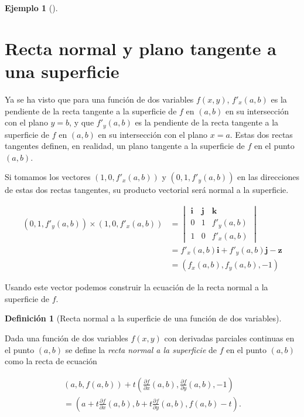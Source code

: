 \documentclass[
  a4paper,
]{scrreport}
\theoremstyle{definition}
\newtheorem{example}{Ejemplo}[chapter]
\theoremstyle{plain}
\theoremstyle{definition}
\newtheorem{definition}{Definición}[chapter]
\theoremstyle{definition}
\theoremstyle{plain}
\theoremstyle{plain}
\theoremstyle{remark}
\begin{document}
\begin{example}[]
\section{Recta normal y plano tangente a una
superficie}\label{recta-normal-y-plano-tangente-a-una-superficie}

Ya se ha visto que para una función de dos variables \(f(x,y)\),
\(f'_{x}(a,b)\) es la pendiente de la recta tangente a la superficie de
\(f\) en \((a,b)\) en su intersección con el plano \(y=b\), y que
\(f'_y(a,b)\) es la pendiente de la recta tangente a la superficie de
\(f\) en \((a,b)\) en su intersección con el plano \(x=a\). Estas dos
rectas tangentes definen, en realidad, un plano tangente a la superficie
de \(f\) en el punto \((a,b)\).

Si tomamos los vectores \((1, 0, f'_x(a,b))\) y \((0, 1, f'_y(a,b))\) en
las direcciones de estas dos rectas tangentes, su producto vectorial
será normal a la superficie.

\begin{align*}
(0, 1, f'_y(a,b)) \times (1, 0, f'_x(a,b))
&= 
\begin{vmatrix}
\mathbf{i} & \mathbf{j} & \mathbf{k} \\
0 & 1 & f'_y(a,b) \\
1 & 0 & f'_x(a,b) 
\end{vmatrix} \\
&= f'_x(a,b) \mathbf{i} + f'_y(a,b) \mathbf{j} - \mathbf{z} \\
&= (f_x(a,b), f_y(a,b), -1)
\end{align*}

Usando este vector podemos construir la ecuación de la recta normal a la
superficie de \(f\).

\begin{definition}[Recta normal a la superficie de una función de dos
variables]\protect\hypertarget{def-recta-normal-superficie}{}\label{def-recta-normal-superficie}

Dada una función de dos variables \(f(x,y)\) con derivadas parciales
continuas en el punto \((a,b)\) se define la \emph{recta normal a la
superficie} de \(f\) en el punto \((a,b)\) como la recta de ecuación

\[
\begin{gathered}
(a, b, f(a,b)) + t \left(\frac{\partial f}{\partial x}(a,b), \frac{\partial f}{\partial y}(a,b), -1\right) \\
= \left(a+t\frac{\partial f}{\partial x}(a,b), b+t\frac{\partial f}{\partial y}(a,b), f(a,b)-t\right).
\end{gathered}
\]


\end{definition}
\end{example}
\end{document}

